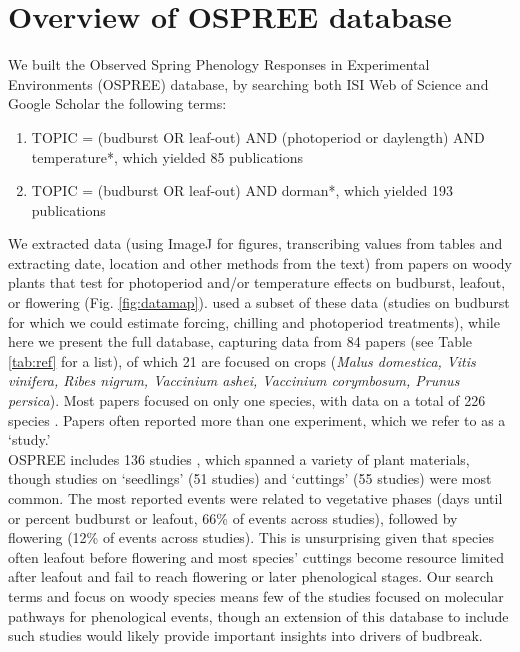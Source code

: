 \documentclass[11pt]{article}
\begin{document}
\section{Overview of OSPREE database}
We built the Observed Spring Phenology Responses in Experimental Environments (OSPREE) database, by searching both ISI Web of Science and Google Scholar  the following terms: 
\begin{enumerate}
\item TOPIC = (budburst OR leaf-out) AND (photoperiod or daylength) AND temperature*, which yielded 85 publications
\item TOPIC = (budburst OR leaf-out) AND dorman*, which yielded 193 publications
\end{enumerate}
We extracted data (using ImageJ for figures, transcribing values from tables and extracting date, location and other methods from the text) from papers on woody plants that test for photoperiod and/or temperature effects on budburst, leafout, or flowering (Fig. \ref{fig:datamap}). \citet{ettinger2020} used a subset of these data (studies on budburst for which we could estimate forcing, chilling and photoperiod treatments), while here we present the full database, capturing data from 84 papers (see Table \ref{tab:ref} for a list), of which 21 are focused on crops (\emph{Malus domestica, Vitis vinifera, Ribes nigrum, Vaccinium ashei, Vaccinium corymbosum, Prunus persica}). Most papers focused on only one species, with data on a total of 226 species \citep[in contrast, long-term observational data often have far more data, for example the PEP725 and NECTAR databases together have multi-site data for more than 2500 species,][]{nectar,Templ2018}. Papers often reported more than one experiment, which we refer to as a `study.' \\

OSPREE includes 136 studies \citep[with the earliest study was conducted in 1947, see][]{Lamb:1948aa}, which spanned a variety of plant materials, though studies on `seedlings' (51 studies) and `cuttings' (55 studies) were most common. The most reported events were related to vegetative phases (days until or percent budburst or leafout, 66\% of events across studies), followed by flowering (12\% of events across studies). This is unsurprising given that species often leafout before flowering and most species' cuttings become resource limited after leafout and fail to reach flowering or later phenological stages. Our search terms and focus on woody species means few of the studies focused on molecular pathways for phenological events, though an extension of this database to include such studies would likely provide important insights into drivers of budbreak. \\
\end{document}
